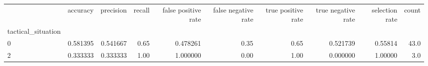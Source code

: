 \begin{tabular}{lrrrrrrrrr}
\toprule
{} &  accuracy &  precision &  recall &  false positive rate &  false negative rate &  true positive rate &  true negative rate &  selection rate &  count \\
tactical\_situation &           &            &         &                      &                      &                     &                     &                 &        \\
\midrule
0                  &  0.581395 &   0.541667 &    0.65 &             0.478261 &                 0.35 &                0.65 &            0.521739 &         0.55814 &   43.0 \\
2                  &  0.333333 &   0.333333 &    1.00 &             1.000000 &                 0.00 &                1.00 &            0.000000 &         1.00000 &    3.0 \\
\bottomrule
\end{tabular}
